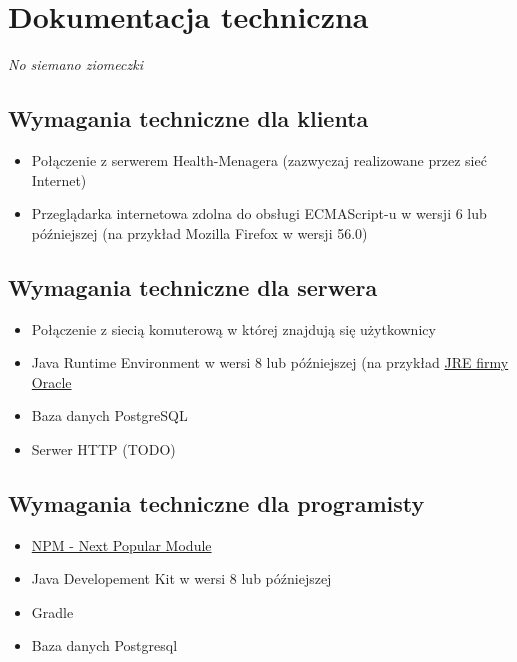 \documentclass[polish,12pt]{aghthesis}
\begin{document}
\section{Dokumentacja techniczna}

\label{sec:dokumentacja-techniczna}

\emph{No siemano ziomeczki}

\subsection{Wymagania techniczne dla klienta}
\begin{itemize}
  \item  Połączenie z serwerem Health-Menagera (zazwyczaj realizowane przez sieć Internet)
  \item Przeglądarka internetowa zdolna do obsługi ECMAScript-u w wersji 6 lub późniejszej (na przykład Mozilla Firefox w wersji 56.0)
\end{itemize}

\subsection{Wymagania techniczne dla serwera}
\begin{itemize}
    \item Połączenie z siecią komuterową w której znajdują się użytkownicy
    \item Java Runtime Environment w wersi 8 lub późniejszej (na przykład \href{https://www.java.com/pl/download/manual.jsp}{JRE firmy Oracle}
    \item Baza danych PostgreSQL
    \item Serwer HTTP (TODO)
\end{itemize}

\subsection{Wymagania techniczne dla programisty}
\begin{itemize}
    \item \href{https://www.npmjs.com/}{NPM - Next Popular Module}
    \item Java Developement Kit w wersi 8 lub późniejszej
    \item Gradle
    \item Baza danych Postgresql
\end{itemize}
\end{document}
